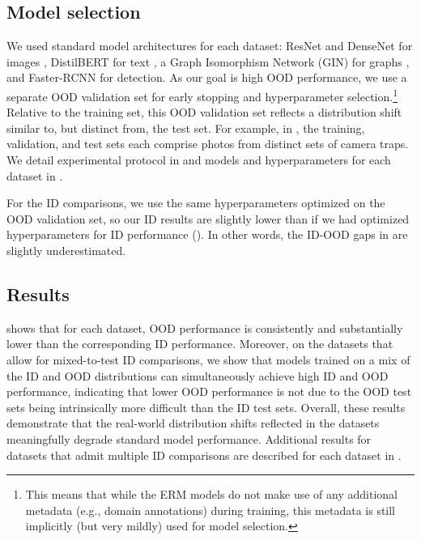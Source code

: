 \subsection{Model selection}\label{sec:erm_drops_model_selection}
We used standard model architectures for each dataset: ResNet and DenseNet for images \citep{he2016resnet, huang2017densely}, DistilBERT for text \citep{sanh2019distilbert}, a Graph Isomorphism Network (GIN) for graphs \citep{xu2018powerful}, and Faster-RCNN \citep{ren2015faster} for detection.
As our goal is high OOD performance,
we use a separate OOD validation set for early stopping and hyperparameter selection.\footnote{This means that while the ERM models do not make use of any additional metadata (e.g., domain annotations) during training, this metadata is still implicitly (but very mildly) used for model selection.}
Relative to the training set, this OOD validation set reflects a distribution shift similar to, but distinct from, the test set.
For example, in \iWildCam, the training, validation, and test sets each comprise photos from distinct sets of camera traps. We detail experimental protocol in  and models and hyperparameters for each dataset in .

For the ID comparisons, we use the same hyperparameters optimized on the OOD validation set, so our ID results are slightly lower than if we had optimized hyperparameters for ID performance (). In other words, the ID-OOD gaps in  are slightly underestimated.


\subsection{Results}
 shows that for each dataset, OOD performance is consistently and substantially lower than the corresponding ID performance.
Moreover, on the datasets that allow for mixed-to-test ID comparisons,
we show that models trained on a mix of the ID and OOD distributions can simultaneously achieve high ID and OOD performance,
indicating that lower OOD performance is not due to the OOD test sets being intrinsically more difficult than the ID test sets.
Overall, these results demonstrate that the real-world distribution shifts reflected in the \Wilds datasets meaningfully degrade standard model performance.
Additional results for datasets that admit multiple ID comparisons are described for each dataset in .


